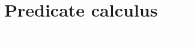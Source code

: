 \documentclass[\ifafour a4paper,12pt,\else a5paper,10pt,\fi%
onecolumn,oneside,article,%
british%
]{memoir}
\title{\propertitle}
\author{%
\hspace*{\stretch{1}}%
\parbox{0.5\linewidth}%
{\protect\centering P.G.L.  Porta Mana\\%
\footnotesize\epost{\email{piero.mana}{ntnu.no}}}%
\hspace*{\stretch{1}}%
}
\date{\firstpublished; updated \updated}
\theoremstyle{remark}
\theoremstyle{innote}
\newcommand*{\amp}{\&}
\newcommand*{\asudedication}[1]{%
{\par\centering\textit{#1}\par}}
\renewcommand*{\|}[1][]{\nonscript\,#1\vert\nonscript\;\mathopen{}}
\begin{document}
\captiondelim{\quad}\captionnamefont{\footnotesize}\captiontitlefont{\footnotesize}
\frenchspacing
\maketitle

\abstractrunin
\abslabeldelim{}
\renewcommand*{\abstractname}{}
\setlength{\absleftindent}{0pt}
\setlength{\absrightindent}{0pt}
\setlength{\abstitleskip}{-\absparindent}

{}\frenchspacing





\section{Predicate calculus}
\label{sec:predcalc}

\textcolor{white}{If you find this you can claim a postcard from me.}
\end{document}
